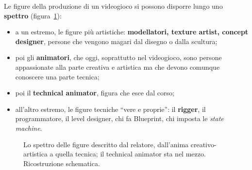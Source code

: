 Le figure della produzione di un videogioco si possono disporre lungo uno
\textbf{spettro} (figura~\ref{p4:fig:spettro}):
\begin{itemize}
  \item a un estremo, le figure più artistiche: \textbf{modellatori,
        texture artist, concept designer}, persone che vengono magari dal
        disegno o dalla scultura;
  \item poi gli \textbf{animatori}, che oggi, soprattutto nel videogioco,
        sono persone appassionate alla parte creativa e artistica ma che
        devono comunque conoscere una parte tecnica;
  \item poi il \textbf{technical animator}, figura che esce dal corso;
  \item all'altro estremo, le figure tecniche ``vere e proprie'': il
        \textbf{rigger}, il programmatore, il level designer, chi fa
        Blueprint, chi imposta le \emph{state machine}.
\end{itemize}

\begin{figure}[htbp]
\centering
{}
\caption{Lo spettro delle figure descritto dal relatore, dall'anima
creativo-artistica a quella tecnica; il technical animator sta nel mezzo.
Ricostruzione schematica.}
\label{p4:fig:spettro}
\end{figure}

